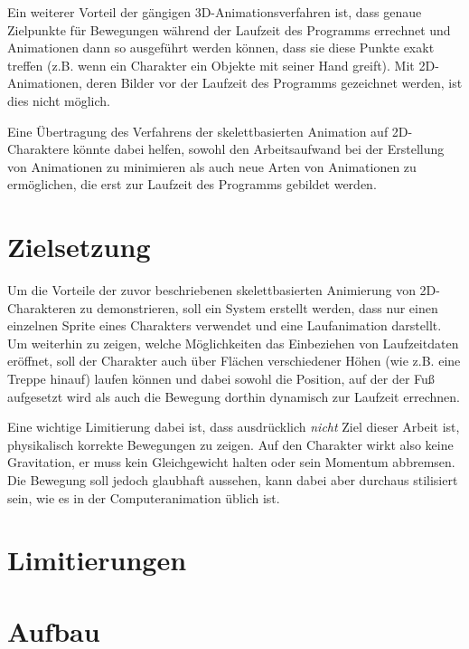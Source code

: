 Ein weiterer Vorteil der gängigen 3D-Animationsverfahren ist, dass genaue Zielpunkte für Bewegungen während der Laufzeit des Programms errechnet und Animationen dann so ausgeführt werden können, dass sie diese Punkte exakt treffen (z.B. wenn ein Charakter ein Objekte mit seiner Hand greift). Mit 2D-Animationen, deren Bilder vor der Laufzeit des Programms gezeichnet werden, ist dies nicht möglich.

Eine Übertragung des Verfahrens der skelettbasierten Animation auf 2D-Charaktere könnte dabei helfen, sowohl den Arbeitsaufwand bei der Erstellung von Animationen zu minimieren als auch neue Arten von Animationen zu ermöglichen, die erst zur Laufzeit des Programms gebildet werden.

\section{Zielsetzung}
Um die Vorteile der zuvor beschriebenen skelettbasierten Animierung von 2D-Charakteren zu demonstrieren, soll ein System erstellt werden, dass nur einen einzelnen Sprite eines Charakters verwendet und eine Laufanimation darstellt. Um weiterhin zu zeigen, welche Möglichkeiten das Einbeziehen von Laufzeitdaten eröffnet, soll der Charakter auch über Flächen verschiedener Höhen (wie z.B. eine Treppe hinauf) laufen können und dabei sowohl die Position, auf der der Fuß aufgesetzt wird als auch die Bewegung dorthin dynamisch zur Laufzeit errechnen.

Eine wichtige Limitierung dabei ist, dass ausdrücklich \textit{nicht} Ziel dieser Arbeit ist, physikalisch korrekte Bewegungen zu zeigen. Auf den Charakter wirkt also keine Gravitation, er muss kein Gleichgewicht halten oder sein Momentum abbremsen. Die Bewegung soll jedoch glaubhaft aussehen, kann dabei aber durchaus stilisiert sein, wie es in der Computeranimation üblich ist.

\section{Limitierungen}

\section{Aufbau}